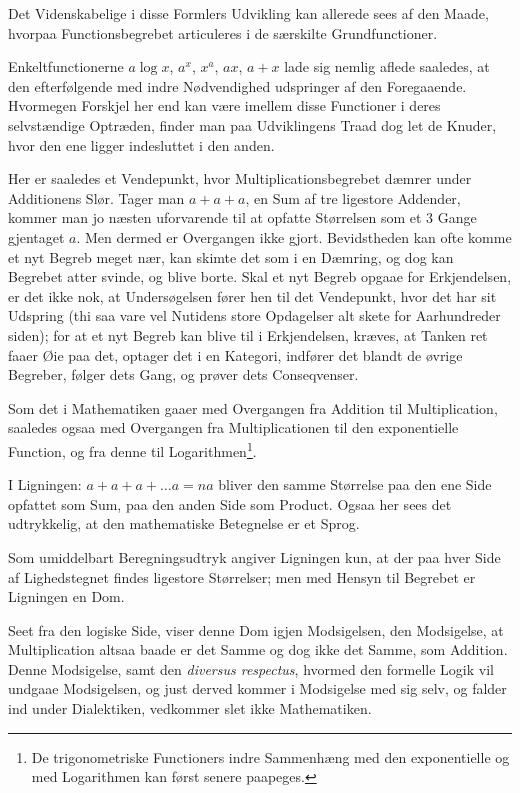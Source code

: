 \documentclass[12pt]{book}
\newcommand{\opage}[1]{\marginnote{\footnotesize\textit{[#1]}}}
\begin{document}
Det Videnskabelige i disse Formlers Udvikling kan allerede sees af den Maade,
hvorpaa Functionsbegrebet articuleres i de særskilte Grundfunctioner.

Enkeltfunctionerne $a\log x$, $a^{x}$, $x^{a}$, $ax$, $a+x$ lade sig nemlig aflede
saaledes, at den efterfølgende med indre Nødvendighed udspringer af den
Foregaaende. Hvormegen Forskjel her end kan være imellem disse Functioner i
deres selvstændige Optræden, finder man paa Udviklingens Traad dog let de Knuder,
hvor den ene ligger indesluttet i den anden.

Her er saaledes et Vendepunkt, hvor Multiplicationsbegrebet dæmrer under
Additionens Slør. Tager man $a+a+a$, en Sum af tre ligestore Addender, kommer man
jo næsten uforvarende til at opfatte Størrelsen som et 3 Gange gjentaget $a$. Men
dermed er Overgangen ikke gjort. Bevidstheden kan ofte komme et nyt Begreb meget
nær, kan skimte det som i en Dæmring, og dog kan Begrebet atter svinde, og blive
borte.
\opage{16} Skal et nyt Begreb opgaae for Erkjendelsen, er det ikke nok, at Undersøgelsen
fører hen til det Vendepunkt, hvor det har sit Udspring (thi saa vare vel
Nutidens store Opdagelser alt skete for Aarhundreder siden); for at et nyt Begreb
kan blive til i Erkjendelsen, kræves, at Tanken ret faaer Øie paa det, optager
det i en Kategori, indfører det blandt de øvrige Begreber, følger dets Gang, og
prøver dets Conseqvenser.

Som det i Mathematiken gaaer med Overgangen fra Addition til Multiplication,
saaledes ogsaa med Overgangen fra Multiplicationen til den exponentielle
Function, og fra denne til Logarithmen\footnote{De trigonometriske Functioners
indre Sammenhæng med den exponentielle og med Logarithmen kan først senere
paapeges.}.

I Ligningen: $a+a+a+\dots a = na$ bliver den samme Størrelse paa den ene Side
opfattet som Sum, paa den anden Side som Product. Ogsaa her sees det udtrykkelig,
at den mathematiske Betegnelse er et Sprog.

Som umiddelbart Beregningsudtryk angiver Ligningen kun, at der paa hver Side af
Lighedstegnet findes ligestore Størrelser; men med Hensyn til Begrebet er
Ligningen en Dom.

Seet fra den logiske Side, viser denne Dom igjen Modsigelsen, den Modsigelse, at
Multiplication altsaa baade er det Samme og dog ikke det Samme, som Addition.
Denne Modsigelse, samt den \textit{diversus respectus}, hvormed den formelle
Logik vil undgaae Modsigelsen, og just derved kommer i Modsigelse med sig selv,
og falder ind under Dialektiken, vedkommer slet ikke Mathematiken.
\end{document}
